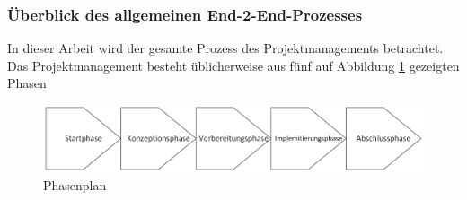 \documentclass[a4paper, 12pt]{scrartcl}
\begin{document}
	\subsubsection{Überblick des allgemeinen End-2-End-Prozesses} %
	In dieser Arbeit wird der gesamte Prozess des Projektmanagements betrachtet. Das Projektmanagement besteht üblicherweise aus fünf auf Abbildung \ref{Projektmanagment} gezeigten Phasen\cite{timinger2024modernes}
	\begin{figure}[h!]
		\begin{center}
			\includegraphics[width=12cm]{Drawing.png}
			\caption{Phasenplan\cite{timinger2024modernes}}
			\label{Projektmanagment}
		\end{center}
		
	\end{figure}
\end{document}
